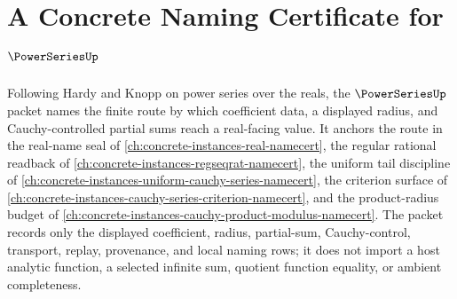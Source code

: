 \chapter{A Concrete Naming Certificate for $\PowerSeriesUp$}
\label{ch:concrete-instances-power-series-namecert}

Following Hardy and Knopp on power series over the reals, the $\PowerSeriesUp$ packet names the finite route by which coefficient data, a displayed radius, and Cauchy-controlled partial sums reach a real-facing value. It anchors the route in the real-name seal of \autoref{ch:concrete-instances-real-namecert}, the regular rational readback of \autoref{ch:concrete-instances-regseqrat-namecert}, the uniform tail discipline of \autoref{ch:concrete-instances-uniform-cauchy-series-namecert}, the criterion surface of \autoref{ch:concrete-instances-cauchy-series-criterion-namecert}, and the product-radius budget of \autoref{ch:concrete-instances-cauchy-product-modulus-namecert}. The packet records only the displayed coefficient, radius, partial-sum, Cauchy-control, transport, replay, provenance, and local naming rows; it does not import a host analytic function, a selected infinite sum, quotient function equality, or ambient completeness.

